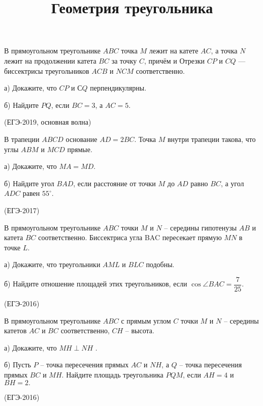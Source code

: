 \documentclass[c,12pt]{beamer}  %
\title{Геометрия треугольника}
\subtitle{ }
\author{\textcopyright}
\date{}
\begin{document}
	
	\frame[plain]{\titlepage}	%
	
	\section{}
	\subsection{}
	\begin{frame}
		\begin{block}{}
			В прямоугольном треугольнике $ ABC $ точка $ M $ лежит на катете $ AC $, а точка $ N $ лежит на продолжении катета $ BC $ за точку $ C $, причём и Отрезки $ CP $ и $ CQ $ — биссектрисы треугольников $ ACB $ и $ NCM $ соответственно.
			
			а) Докажите, что $ CP $ и $ СQ $ перпендикулярны.
			
			б) Найдите $ PQ $, если $ BC=3 $, а $ AC=5 $.
			
			(ЕГЭ-2019, основная волна)
		\end{block}
	\end{frame}
	\begin{frame}
		\begin{block}{}
			В трапеции $ABCD$ основание $AD = 2BC$. Точка $M$ внутри
			трапеции такова, что углы $ABM$ и $MCD$ прямые.
			
			а) Докажите, что $MA = MD$.
			
			б) Найдите угол $BAD$, если расстояние от точки $M$ до $AD$ равно
			$BC$, а угол $ADC$ равен $55^{\circ}$.
			
			(ЕГЭ-2017)
		\end{block}
	\end{frame}

	\begin{frame}
		\begin{block}{}
			В прямоугольном треугольнике $ABC$ точки $M$ и $N$ – середины
			гипотенузы $AB$ и катета $BC$ соответственно. Биссектриса угла
			BAC пересекает прямую $ MN $ в точке $L$.
			
			а) Докажите, что треугольники $ AML $ и $ BLC $ подобны.
			
			б) Найдите отношение площадей этих треугольников, если $\cos \angle BAC = \dfrac{7}{25} $.
			
			(ЕГЭ-2016)
		\end{block}
	\end{frame}


	\begin{frame}
		\begin{block}{}
			В прямоугольном треугольнике $ ABC $ с прямым углом $ C $ точки $ M $ и $ N $ – середины катетов $ AC $ и $ BC $ соответственно, $ CH $ – высота.
			
			а) Докажите, что $ MH \perp NH $ .
			
			б) Пусть $ P $ – точка пересечения прямых $ AC $ и $ NH $, а $ Q $ – точка	пересечения прямых $ BC $ и $ MH $. Найдите площадь треугольника
			$ PQM $, если $ AH = 4 $ и $ BH = 2. $
			
			(ЕГЭ-2016)
		\end{block}
	\end{frame}
\end{document}
